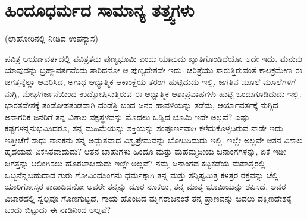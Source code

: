 
\chapter{ಹಿಂದೂಧರ್ಮದ ಸಾಮಾನ್ಯ ತತ್ತ್ವಗಳು}

\begin{center}
(ಲಾಹೋರಿನಲ್ಲಿ ನೀಡಿದ ಉಪನ್ಯಾಸ)
\end{center}

ಪವಿತ್ರ ಆರ್ಯಾವರ್ತದಲ್ಲಿ ಪವಿತ್ರತಮ ಪುಣ್ಯಭೂಮಿ ಎಂದು ಯಾವುದು ಖ್ಯಾತಿಗೊಂಡಿದೆಯೋ ಅದೇ ಇದು. ಮನುವು ಯಾವುದನ್ನು ಬ್ರಹ್ಮಾವರ್ತವೆಂದು ಸಾರಿದನೋ ಆ ಪುಣ್ಯದೇಶವೇ ಇದು. ಚರಿತ್ರೆಯು ಸಾರುತ್ತಿರುವಂತೆ ಕಾಲಕ್ರಮೇಣ ಈ ಜಗತ್ತನ್ನೆಲ್ಲಾ ಆವರಿಸಿದ, ಅಗಾಧ ಆಧ್ಯಾತ್ಮಿಕ ಆಕಾಂಕ್ಷೆಯ ತರಂಗ ಹುಟ್ಟಿದುದು ಇಲ್ಲಿ. ಜಗತ್ತಿನ ಮೂಲೆ ಮೂಲೆಗಳಿಗೆ ನುಗ್ಗಿ, ಮೇಘಗರ್ಜನೆಯಿಂದ ಉದ್ಘೋಷಿಸುತ್ತಿರುವ ಈ ಆಧ್ಯಾತ್ಮಿಕ ಆಶಾಪ್ರವಾಹಗಳು ಹುಟ್ಟಿ ಒಂದುಗೂಡಿದುದು ಇಲ್ಲಿ. ಭಾರತದೇಶಕ್ಕೆ ತಂಡೋಪತಂಡವಾಗಿ ದಂಡೆತ್ತಿ ಬಂದ ಜನರ ಹಾವಳಿಯನ್ನು ತಡೆದು, ಆರ್ಯಾವರ್ತಕ್ಕೆ ನುಗ್ಗಿದ ಅನಾಗರಿಕ ಜನರಿಗೆ ತನ್ನ ವಿಶಾಲ ವಕ್ಷಸ್ಥಳವನ್ನು ಮೊದಲು ಒಡ್ಡಿದ ಭೂಮಿ ಇದೇ ಅಲ್ಲವೆ? ಎಷ್ಟು ಕಷ್ಟಗಳನ್ನನುಭವಿಸಿದರೂ, ತನ್ನ ಮಹಿಮೆಯನ್ನು ಶಕ್ತಿಯನ್ನು ಸಂಪೂರ್ಣವಾಗಿ ಕಳೆದುಕೊಳ್ಳದಿರುವ ನಾಡೇ ಇದು. ಇತ್ತೀಚೆಗೆ ಸಾಧು ನಾನಕನು ತನ್ನ ಅದ್ಭುತವಾದ ವಿಶ್ವಪ್ರೇಮವನ್ನು ಬೋಧಿಸಿದುದು ಇಲ್ಲಿ. ಇಲ್ಲೇ ಅಲ್ಲವೇ ಆತನ ವಿಶಾಲ ಹೃದಯವು ವಿಕಸಿತವಾದುದು? ಆತನ ಬಾಹುಗಳು ಹಿಂದೂ ಮತ್ತು ಮಹಮ್ಮದೀಯ ಜನಾಂಗಗಳನ್ನು, ಏಕೆ ಇಡೀ ಜಗತ್ತನ್ನು ಆಲಿಂಗಿಸಲು ಹೊರಚಾಚಿದುದು ಇಲ್ಲೇ ಅಲ್ಲವೆ? ನಮ್ಮ ಜನಾಂಗದ ಕಟ್ಟಕಡೆಯ ಮಹಾತ್ಮರಲ್ಲಿ ಒಬ್ಬನೆನ್ನಬಹುದಾದ ಗುರು ಗೋವಿಂದಸಿಂಗನು ಧರ್ಮಕ್ಕಾಗಿ ತನ್ನ ಮತ್ತು ತನ್ನಿಷ್ಟಮಿತ್ರ ಕಳತ್ರರ ರಕ್ತವನ್ನು ಚೆಲ್ಲಿ, ಯಾರಿಗೋಸ್ಕರ ಕಾದಾಡಿದನೋ ಅವರೇ ತನ್ನನ್ನು ದೂರ ನೂಕಲು, ತನ್ನ ಮಾತೃ ಭೂಮಿಯನ್ನು ಶಪಿಸದೆ, ಅವರ ವಿಚಾರದಲ್ಲಿ ಸ್ವಲ್ಪವೂ ಗೊಣಗುಟ್ಟದೆ, ಗಾಯ ಹೊಂದಿದ ಮೃಗರಾಜನಂತೆ ತನ್ನ ಪ್ರಾಣವನ್ನು ಬಿಡಲು ದಕ್ಷಿಣದೇಶಕ್ಕೆ ಬಂದು ಬಿಟ್ಟುದು ಈ ನಾಡಿನಿಂದ ಅಲ್ಲವೆ?

